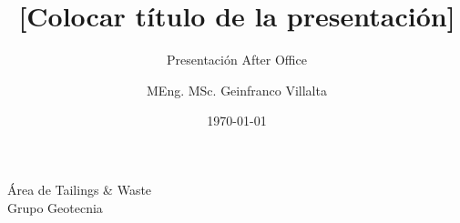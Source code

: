 \title[Geotecnia sísmica]{[Colocar título de la presentación]}
\subtitle[After Office]{Presentación After Office} 
\author{MEng. MSc. Geinfranco Villalta}
\institute
{Área de Tailings \& Waste\\
Grupo Geotecnia}
\date{\today}



